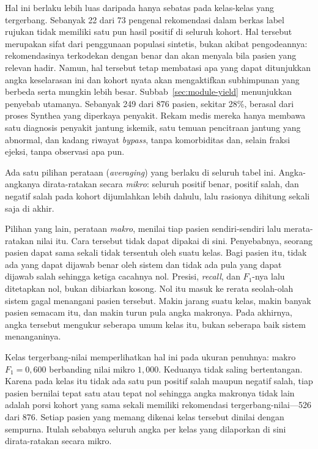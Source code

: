 Hal ini berlaku lebih luas daripada hanya sebatas pada kelas-kelas yang tergerbang. Sebanyak 22 dari
73 pengenal rekomendasi dalam berkas label rujukan tidak memiliki satu pun hasil
positif di seluruh kohort. Hal tersebut merupakan sifat dari penggunaan populasi sintetis, bukan akibat pengodeannya:
rekomendasinya terkodekan dengan benar dan akan menyala bila pasien yang relevan hadir. Namun, hal
tersebut tetap membatasi apa yang dapat ditunjukkan angka keselarasan ini dan kohort nyata akan
mengaktifkan subhimpunan yang berbeda serta mungkin lebih besar. Subbab~\ref{sec:module-yield} menunjukkan penyebab utamanya. Sebanyak 249 dari 876 pasien,
sekitar 28\%, berasal dari proses Synthea yang diperkaya penyakit. Rekam medis mereka hanya
membawa satu diagnosis penyakit jantung iskemik, satu temuan pencitraan jantung yang
abnormal, dan kadang riwayat \emph{bypass}, tanpa komorbiditas dan, selain fraksi ejeksi,
tanpa observasi apa pun.

Ada satu pilihan perataan (\emph{averaging}) yang berlaku di seluruh tabel ini. Angka-angkanya dirata-ratakan secara \emph{mikro}: seluruh
positif benar, positif salah, dan negatif salah pada kohort dijumlahkan lebih dahulu, lalu
rasionya dihitung sekali saja di akhir.

Pilihan yang lain, perataan \emph{makro}, menilai tiap pasien sendiri-sendiri lalu
merata-ratakan nilai itu. Cara tersebut tidak dapat dipakai di sini. Penyebabnya, seorang pasien dapat sama sekali tidak tersentuh oleh suatu kelas. Bagi pasien
itu, tidak ada yang dapat dijawab benar oleh sistem dan tidak ada pula yang dapat dijawab
salah sehingga ketiga cacahnya nol. Presisi, \emph{recall}, dan $F_1$-nya lalu ditetapkan
nol, bukan dibiarkan kosong. Nol itu masuk ke rerata seolah-olah
sistem gagal menangani pasien tersebut. Makin jarang suatu kelas, makin banyak pasien semacam
itu, dan makin turun pula angka makronya. Pada akhirnya, angka tersebut mengukur seberapa umum kelas itu, bukan seberapa baik sistem menanganinya.

Kelas tergerbang-nilai memperlihatkan hal ini pada ukuran penuhnya: makro $F_1 = 0{,}600$
berbanding nilai mikro $1{,}000$. Keduanya tidak saling bertentangan. Karena pada kelas itu
tidak ada satu pun positif salah maupun negatif salah, tiap pasien bernilai tepat satu atau
tepat nol sehingga angka makronya tidak lain adalah porsi kohort yang sama sekali memiliki
rekomendasi tergerbang-nilai---526 dari 876. Setiap pasien yang memang dikenai kelas tersebut
dinilai dengan sempurna. Itulah sebabnya seluruh angka per kelas yang dilaporkan di sini
dirata-ratakan secara mikro.

